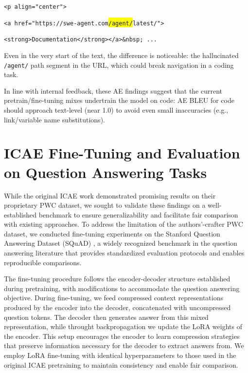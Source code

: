 \quad\texttt{<p align="center">}

\quad\texttt{<a href="https://swe-agent.com}\colorbox{yellow}{\texttt{/agent/}}\texttt{latest/">}

\quad\texttt{<strong>Documentation</strong></a>\&nbsp; ...}

\noindent Even in the very start of the text, the difference is noticeable: the hallucinated \texttt{/agent/} path segment in the URL, which could break navigation in a coding task.


In line with internal feedback, these AE findings suggest that the current pretrain/fine-tuning mixes undertrain the model on code: AE BLEU for code should approach text-level (near 1.0) to avoid even small inaccuracies (e.g., link/variable name substitutions).



\section{ICAE Fine-Tuning and Evaluation on Question Answering Tasks}

While the original ICAE work \cite{ge_-context_2024} demonstrated promising results on their proprietary PWC dataset, we sought to validate these findings on a well-established benchmark to ensure generalizability and facilitate fair comparison with existing approaches.
To address the limitation of the authors'-crafter PWC dataset, we conducted fine-tuning experiments on the Stanford Question Answering Dataset (SQuAD) \cite{squad}, a widely recognized benchmark in the question answering literature that provides standardized evaluation protocols and enables reproducible comparisons.

The fine-tuning procedure follows the encoder-decoder structure established during pretraining, with modifications to accommodate the question answering objective.
During fine-tuning, we feed compressed context representations produced by the encoder into the decoder, concatenated with uncompressed question tokens.
The decoder then generates answer from this mixed representation, while throught backpropagation we update the LoRA weights of the encoder.
This setup encourages the encoder to learn compression strategies that preserve information necessary for the decoder to extract answers from.
We employ LoRA fine-tuning \cite{hu2021lora} with identical hyperparameters to those used in the original ICAE pretraining to maintain consistency and enable fair comparison.

